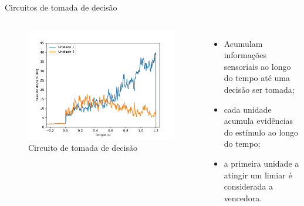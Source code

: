 \begin{frame}{Circuitos de tomada de decisão}
	\begin{columns}[t]
		\column{5cm}
			\begin{figure}[tb]
				\centering
				\caption{Circuito de tomada de decisão}
				\label{fig:tomadadecisao}
				\includegraphics[width=\linewidth]{figs/tomada_decisao}
			\end{figure}
		\column{5cm}
			\begin{itemize}
				\item Acumulam informações sensoriais ao longo do tempo até uma decisão ser tomada;
				\item cada unidade acumula evidências do estímulo ao longo do tempo;
				\item a primeira unidade a atingir um limiar é considerada a vencedora.
			\end{itemize}
	\end{columns}
\end{frame}


